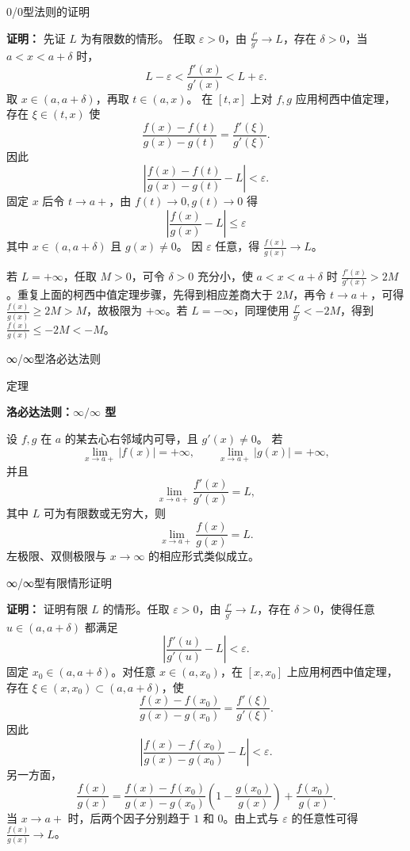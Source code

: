 \documentclass[aspectratio=169,10pt,fontset=fandol]{ctexbeamer}
\begin{document}
\begin{frame}[t,fragile]{0/0型法则的证明}
\footnotesize
{\footnotesize
\textbf{证明：}
先证 $L$ 为有限数的情形。 任取 $\varepsilon>0$，由 $\frac{f'}{g'}\to L$，存在 $\delta>0$，当 $a<x<a+\delta$ 时，
\[
L-\varepsilon<\frac{f'(x)}{g'(x)}<L+\varepsilon.
\]
取 $x\in(a,a+\delta)$，再取 $t\in(a,x)$。 在 $[t,x]$ 上对 $f,g$ 应用柯西中值定理，存在 $\xi\in(t,x)$ 使
\[
\frac{f(x)-f(t)}{g(x)-g(t)}=\frac{f'(\xi)}{g'(\xi)}.
\]
因此
\[
\left|\frac{f(x)-f(t)}{g(x)-g(t)}-L\right|<\varepsilon.
\]
固定 $x$ 后令 $t\to a+$，由 $f(t)\to0,g(t)\to0$ 得
\[
\left|\frac{f(x)}{g(x)}-L\right|\leq\varepsilon
\]
其中 $x\in(a,a+\delta)$ 且 $g(x)\neq0$。 因 $\varepsilon$ 任意，得 $\frac{f(x)}{g(x)}\to L$。

若 $L=+\infty$，任取 $M>0$，可令 $\delta>0$ 充分小，使 $a<x<a+\delta$ 时 $\frac{f'(x)}{g'(x)}>2M$。重复上面的柯西中值定理步骤，先得到相应差商大于 $2M$，再令 $t\to a+$，可得 $\frac{f(x)}{g(x)}\geq2M>M$，故极限为 $+\infty$。若 $L=-\infty$，同理使用 $\frac{f'}{g'}<-2M$，得到 $\frac{f(x)}{g(x)}\leq-2M<-M$。

}
\end{frame}
\begin{frame}[t,fragile]{∞/∞型洛必达法则}
\footnotesize
\begin{block}{定理}
{\footnotesize
\textbf{洛必达法则：$\infty/\infty$ 型}\par

设 $f,g$ 在 $a$ 的某去心右邻域内可导，且 $g'(x)\neq0$。 若
\[
\lim_{x\to a+}|f(x)|=+\infty,\qquad
\lim_{x\to a+}|g(x)|=+\infty,
\]
并且
\[
\lim_{x\to a+}\frac{f'(x)}{g'(x)}=L,
\]
其中 $L$ 可为有限数或无穷大，则
\[
\lim_{x\to a+}\frac{f(x)}{g(x)}=L.
\]
左极限、双侧极限与 $x\to\infty$ 的相应形式类似成立。

}
\end{block}
\end{frame}
\begin{frame}[t,fragile]{∞/∞型有限情形证明}
\footnotesize
{\footnotesize
\textbf{证明：}
证明有限 \(L\) 的情形。任取 \(\varepsilon>0\)，由 \(\frac{f'}{g'}\to L\)，存在 \(\delta>0\)，使得任意 \(u\in(a,a+\delta)\) 都满足
\[
\left|\frac{f'(u)}{g'(u)}-L\right|<\varepsilon.
\]
固定 \(x_0\in(a,a+\delta)\)。对任意 \(x\in(a,x_0)\)，在 \([x,x_0]\) 上应用柯西中值定理，存在 \(\xi\in(x,x_0)\subset(a,a+\delta)\)，使
\[
\frac{f(x)-f(x_0)}{g(x)-g(x_0)}=\frac{f'(\xi)}{g'(\xi)}.
\]
因此
\[
\left|\frac{f(x)-f(x_0)}{g(x)-g(x_0)}-L\right|<\varepsilon.
\]
另一方面，
\[
\frac{f(x)}{g(x)}
=\frac{f(x)-f(x_0)}{g(x)-g(x_0)}
\left(1-\frac{g(x_0)}{g(x)}\right)
+\frac{f(x_0)}{g(x)}.
\]
当 \(x\to a+\) 时，后两个因子分别趋于 \(1\) 和 \(0\)。由上式与 \(\varepsilon\) 的任意性可得 \(\frac{f(x)}{g(x)}\to L\)。


}
\end{frame}
\end{document}

